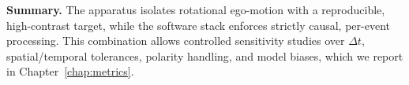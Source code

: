 \medskip
\noindent\textbf{Summary.} The apparatus isolates rotational ego-motion with a reproducible, high-contrast target, while the software stack enforces strictly causal, per-event processing. This combination allows controlled sensitivity studies over $\Delta t$, spatial/temporal tolerances, polarity handling, and model biases, which we report in Chapter~\ref{chap:metrics}.

